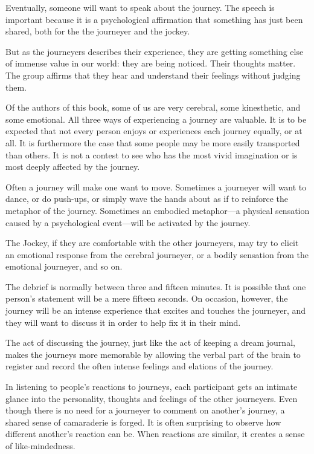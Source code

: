\documentclass[12pt]{book}
\begin{document}
Eventually, someone will want to speak about the journey. The speech
is important because it is a psychological affirmation that something
has just been shared, both for the the journeyer and the jockey.
					
But as the journeyers describes their experience, they are getting
something else of immense value in our world: they are being
noticed. Their thoughts matter. The group affirms that they hear and
understand their feelings without judging them.
					
Of the authors of this book, some of us are very cerebral, some
kinesthetic, and some emotional. All three ways of experiencing a
journey are valuable. It is to be expected that not every person
enjoys or experiences each journey equally, or at all. It is
furthermore the case that some people may be more easily transported
than others.  It is not a contest to see who has the most vivid
imagination or is most deeply affected by the journey.

Often a journey will make one want to move. Sometimes a journeyer will
want to dance, or do push-ups, or simply wave the hands about as if to
reinforce the metaphor of the journey. Sometimes an embodied
metaphor---a physical sensation caused by a psychological
event---will be activated by the journey.
					
The Jockey, if they are comfortable with the other journeyers, may try
to elicit an emotional response from the cerebral journeyer, or a
bodily sensation from the emotional journeyer, and so on.
					
The debrief is normally between three and fifteen minutes. It is
possible that one person's statement will be a mere fifteen
seconds. On occasion, however, the journey will be an intense
experience that excites and touches the journeyer, and they will want
to discuss it in order to help fix it in their mind.

The act of discussing the journey, just like the act of keeping a
dream journal, makes the journeys more memorable by allowing the
verbal part of the brain to register and record the often intense
feelings and elations of the journey.
					
In listening to people's reactions to journeys, each participant gets
an intimate glance into the personality, thoughts and feelings of the
other journeyers. Even though there is no need for a journeyer to
comment on another's journey, a shared sense of camaraderie is
forged. It is often surprising to observe how different another's
reaction can be. When reactions are similar, it creates a sense of
like-mindedness.
					
\end{document}

